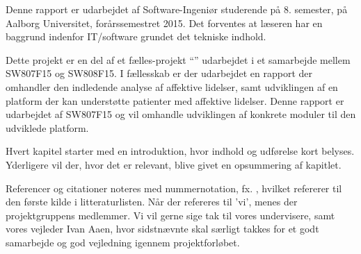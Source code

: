 Denne rapport er udarbejdet af Software-Ingeniør studerende på 8. semester, på Aalborg Universitet, forårssemestret 2015.
Det forventes at læseren har en baggrund indenfor IT/software grundet det tekniske indhold.

Dette projekt er en del af et fælles-projekt ``''\cite{faelles} udarbejdet i et samarbejde mellem SW807F15 og SW808F15.
I fællesskab er der udarbejdet en rapport der omhandler den indledende analyse af affektive lidelser, samt udviklingen af en platform der kan understøtte patienter med affektive lidelser.
Denne rapport er udarbejdet af SW807F15 og vil omhandle udviklingen af konkrete moduler til den udviklede platform.

Hvert kapitel starter med en introduktion, hvor indhold og udførelse kort belyses.
Yderligere vil der, hvor det er relevant, blive givet en opsummering af kapitlet.

Referencer og citationer noteres med nummernotation, fx. \cite{faelles}, hvilket refererer til den første kilde i litteraturlisten.
Når der refereres til 'vi', menes der projektgruppens medlemmer.
\newline
\newline
Vi vil gerne sige tak til vores undervisere, samt vores vejleder Ivan Aaen, hvor sidstnævnte skal særligt takkes for et godt samarbejde og god vejledning igennem projektforløbet.
